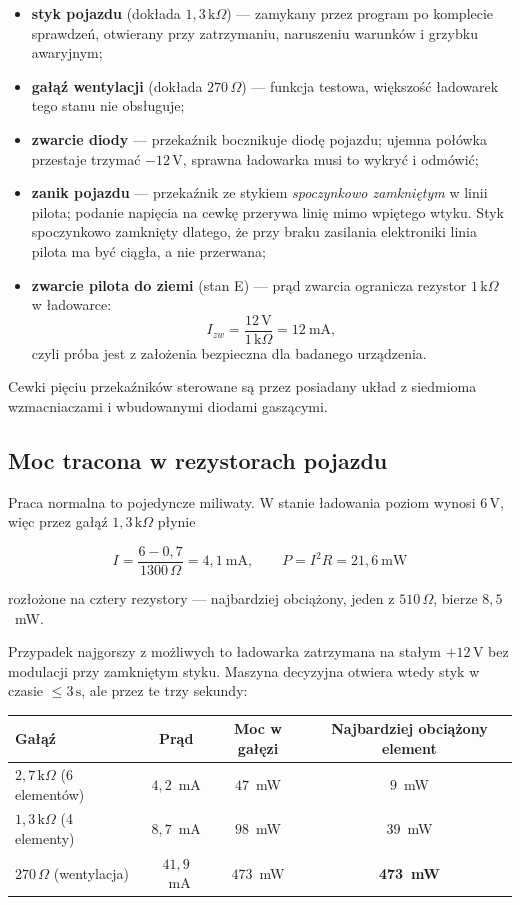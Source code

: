 \documentclass[a4paper,11pt]{article}
\newcommand{\ohm}{\,\Omega}
\newcommand{\kohm}{\,\mathrm{k}\Omega}
\newcommand{\volt}{\,\mathrm{V}}
\newcommand{\sek}{\,\mathrm{s}}
\begin{document}
\begin{itemize}
\item \textbf{styk pojazdu} (dokłada $1{,}3\kohm$) --- zamykany przez program po
      komplecie sprawdzeń, otwierany przy zatrzymaniu, naruszeniu warunków
      i grzybku awaryjnym;
\item \textbf{gałąź wentylacji} (dokłada $270\ohm$) --- funkcja testowa, większość
      ładowarek tego stanu nie obsługuje;
\item \textbf{zwarcie diody} --- przekaźnik bocznikuje diodę pojazdu; ujemna połówka
      przestaje trzymać $-12\volt$, sprawna ładowarka musi to wykryć i odmówić;
\item \textbf{zanik pojazdu} --- przekaźnik ze stykiem \emph{spoczynkowo zamkniętym}
      w linii pilota; podanie napięcia na cewkę przerywa linię mimo wpiętego wtyku.
      Styk spoczynkowo zamknięty dlatego, że przy braku zasilania elektroniki linia
      pilota ma być ciągła, a nie przerwana;
\item \textbf{zwarcie pilota do ziemi} (stan E) --- prąd zwarcia ogranicza rezystor
      $1\kohm$ w ładowarce:
      \[
      I_{zw}=\frac{12\volt}{1\kohm}=12\ \mathrm{mA},
      \]
      czyli próba jest z założenia bezpieczna dla badanego urządzenia.
\end{itemize}

Cewki pięciu przekaźników sterowane są przez posiadany układ z siedmioma
wzmacniaczami i wbudowanymi diodami gaszącymi.

\subsection{Moc tracona w rezystorach pojazdu}

Praca normalna to pojedyncze miliwaty. W stanie ładowania poziom wynosi $6\volt$,
więc przez gałąź $1{,}3\kohm$ płynie

\[
I=\frac{6-0{,}7}{1300\ohm}=4{,}1\ \mathrm{mA},
\qquad
P=I^2R=21{,}6\ \mathrm{mW}
\]

rozłożone na cztery rezystory --- najbardziej obciążony, jeden z $510\ohm$, bierze
$8{,}5$~mW.

Przypadek najgorszy z możliwych to ładowarka zatrzymana na stałym $+12\volt$ bez
modulacji przy zamkniętym styku. Maszyna decyzyjna otwiera wtedy styk w czasie
$\le 3\sek$, ale przez te trzy sekundy:

\begin{center}
\begin{tabular}{lccc}
\toprule
Gałąź & Prąd & Moc w gałęzi & Najbardziej obciążony element \\
\midrule
$2{,}7\kohm$ (6 elementów) & $4{,}2$~mA & $47$~mW & $9$~mW \\
$1{,}3\kohm$ (4 elementy)  & $8{,}7$~mA & $98$~mW & $39$~mW \\
$270\ohm$ (wentylacja)     & $41{,}9$~mA & $473$~mW & \textbf{473~mW} \\
\bottomrule
\end{tabular}
\end{center}
\end{document}
